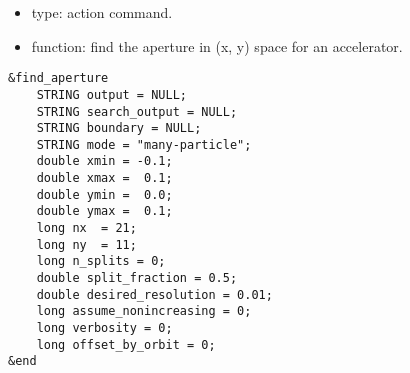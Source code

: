 \documentclass[11pt]{article}
\begin{document}
\begin{itemize}
\item type: action command.
\item function: find the aperture in (x, y) space for an accelerator.
\end{itemize}

\begin{verbatim}
&find_aperture
    STRING output = NULL;
    STRING search_output = NULL;
    STRING boundary = NULL;
    STRING mode = "many-particle";
    double xmin = -0.1;
    double xmax =  0.1;
    double ymin =  0.0;
    double ymax =  0.1;
    long nx  = 21;
    long ny  = 11;
    long n_splits = 0;
    double split_fraction = 0.5;
    double desired_resolution = 0.01;
    long assume_nonincreasing = 0;
    long verbosity = 0;    
    long offset_by_orbit = 0;
&end
\end{verbatim}
\end{document}
